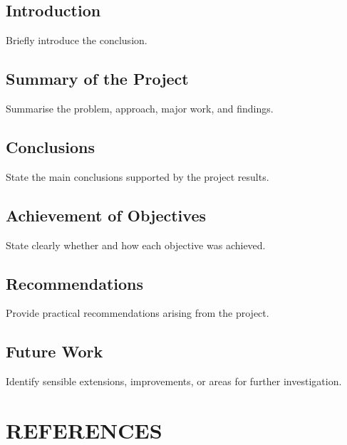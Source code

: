 \documentclass[12pt,a4paper]{report}
\begin{document}
\section{Introduction}
Briefly introduce the conclusion.

\section{Summary of the Project}
Summarise the problem, approach, major work, and findings.

\section{Conclusions}
State the main conclusions supported by the project results.

\section{Achievement of Objectives}
State clearly whether and how each objective was achieved.

\section{Recommendations}
Provide practical recommendations arising from the project.

\section{Future Work}
Identify sensible extensions, improvements, or areas for further investigation.


\clearpage
\chapter*{REFERENCES}

%
\end{document}
